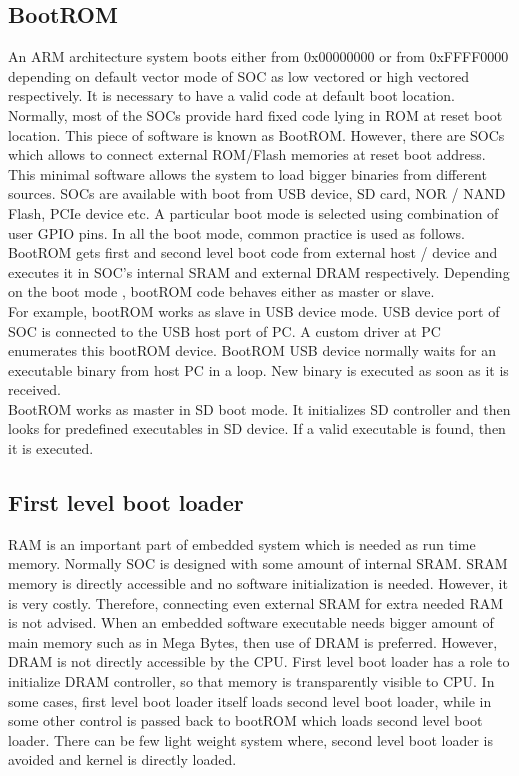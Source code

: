 \subsection {BootROM}
\indent An ARM architecture system boots either from 0x00000000 or from
0xFFFF0000 depending on default vector mode of SOC as low vectored or
high vectored respectively. It is necessary to have a valid code at
default boot location. Normally, most of the SOCs provide hard fixed
code lying in ROM at reset boot location. This piece of software is
known as BootROM. However, there are SOCs which allows to connect
external ROM/Flash memories at reset boot address. \\
\indent This minimal software allows the system to load bigger binaries
from different sources. SOCs are available with boot from USB device, SD
card, NOR / NAND Flash, PCIe device etc. A particular boot mode is
selected using combination of user GPIO pins. In all the boot mode,
common practice is used as follows. BootROM gets first and second level
boot code from external host / device and executes it in SOC's internal
SRAM and external DRAM respectively. Depending on the boot mode ,
bootROM code behaves either as master or slave.\\
\indent For example, bootROM works as slave in USB device mode. USB
device port of SOC is connected to the USB host port of PC. A custom
driver at PC enumerates this bootROM device. BootROM USB device normally
waits for an executable binary from host PC in a loop. New binary is
executed as soon as it is received.\\
\indent BootROM works as master in SD boot mode. It initializes SD
controller and then looks for predefined executables in SD device. If
a valid executable is found, then it is executed.
\subsection {First level boot loader}
\indent RAM is an important part of embedded system which is needed as
run time memory. Normally SOC is designed with some amount of internal
SRAM. SRAM memory is directly accessible and no software initialization
is needed. However, it is very costly. Therefore, connecting even
external SRAM for extra needed RAM is not advised. When an embedded
software executable needs bigger amount of main memory such as in Mega
Bytes, then use of DRAM is preferred. However, DRAM is not directly
accessible by the CPU. First level boot loader has a role to
initialize DRAM controller, so that memory is transparently visible to
CPU. In some cases, first level boot loader itself loads second level
boot loader, while in some other control is passed back to bootROM which
loads second level boot loader. There can be few light weight system
where, second level boot loader is avoided and kernel is directly
loaded.
